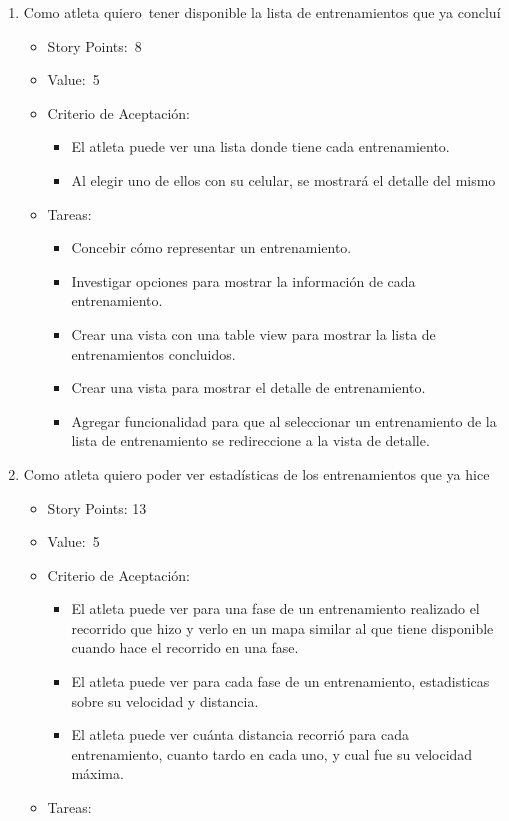 \begin{enumerate}
\def\labelenumi{\arabic{enumi})}
\item
  Como atleta quiero~tener disponible la lista de entrenamientos que ya
  concluí

  \begin{itemize}
  \item
    Story Points:~8
  \item
    Value:~5
  \item
    Criterio de Aceptación:

    \begin{itemize}
    \itemsep1pt\parskip0pt
    \item
      El atleta puede ver una lista donde tiene cada entrenamiento.
    \item
      Al elegir uno de ellos con su celular, se mostrará el detalle del
      mismo
    \end{itemize}
  \item
    Tareas:

    \begin{itemize}
    \itemsep1pt\parskip0pt
    \item
      Concebir cómo representar un entrenamiento.
    \item
      Investigar opciones para mostrar la información de cada
      entrenamiento.
    \item
      Crear una vista con una table view para mostrar la lista de
      entrenamientos concluidos.
    \item
      Crear una vista para mostrar el detalle de entrenamiento.
    \item
      Agregar funcionalidad para que al seleccionar un entrenamiento de
      la lista de entrenamiento se redireccione a la vista de detalle.
    \end{itemize}
  \end{itemize}
\item
  Como atleta quiero poder ver estadísticas de los entrenamientos que ya
  hice

  \begin{itemize}
  \item
    Story Points: 13
  \item
    Value:~5
  \item
    Criterio de Aceptación:

    \begin{itemize}
    \item
      El atleta puede ver para una fase de un entrenamiento realizado el
      recorrido que hizo y verlo en un mapa similar al que tiene
      disponible cuando hace el recorrido en una fase.
    \item
      El atleta puede ver para cada fase de un entrenamiento,
      estadisticas sobre su velocidad y distancia.
    \item
      El atleta puede ver cuánta distancia recorrió para cada
      entrenamiento, cuanto tardo en cada uno, y cual fue su velocidad
      máxima.
    \end{itemize}
  \item
    Tareas:


\end{itemize}
\end{enumerate}
